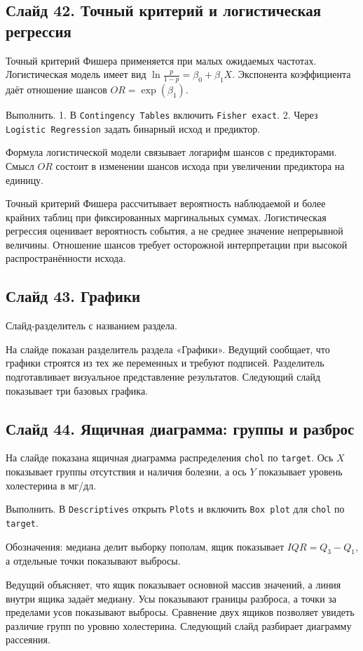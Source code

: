\documentclass[11pt,a4paper]{article}
\begin{document}
\subsection*{Слайд 42. Точный критерий и логистическая регрессия}
\begin{onslide}
Точный критерий Фишера применяется при малых ожидаемых частотах. Логистическая модель имеет вид $\ln\frac{p}{1-p}=\beta_0+\beta_1X$. Экспонента коэффициента даёт отношение шансов $OR=\exp(\beta_1)$.
\end{onslide}
\begin{jamovi}
Выполнить. 1. В \texttt{Contingency Tables} включить \texttt{Fisher exact}. 2. Через \texttt{Logistic Regression} задать бинарный исход и предиктор.\par Формула логистической модели связывает логарифм шансов с предикторами. Смысл $OR$ состоит в изменении шансов исхода при увеличении предиктора на единицу.
\end{jamovi}
Точный критерий Фишера рассчитывает вероятность наблюдаемой и более крайних таблиц при фиксированных маргинальных суммах. Логистическая регрессия оценивает вероятность события, а не среднее значение непрерывной величины. Отношение шансов требует осторожной интерпретации при высокой распространённости исхода.

\subsection*{Слайд 43. Графики}
\begin{onslide}
Слайд-разделитель с названием раздела.
\end{onslide}
На слайде показан разделитель раздела «Графики». Ведущий сообщает, что графики строятся из тех же переменных и требуют подписей. Разделитель подготавливает визуальное представление результатов. Следующий слайд показывает три базовых графика.

\subsection*{Слайд 44. Ящичная диаграмма: группы и разброс}
\begin{onslide}
На слайде показана ящичная диаграмма распределения \texttt{chol} по \texttt{target}. Ось $X$ показывает группы отсутствия и наличия болезни, а ось $Y$ показывает уровень холестерина в мг/дл.
\end{onslide}
\begin{jamovi}
Выполнить. В \texttt{Descriptives} открыть \texttt{Plots} и включить \texttt{Box plot} для \texttt{chol} по \texttt{target}.\par Обозначения: медиана делит выборку пополам, ящик показывает $IQR=Q_3-Q_1$, а отдельные точки показывают выбросы.
\end{jamovi}
Ведущий объясняет, что ящик показывает основной массив значений, а линия внутри ящика задаёт медиану. Усы показывают границы разброса, а точки за пределами усов показывают выбросы. Сравнение двух ящиков позволяет увидеть различие групп по уровню холестерина. Следующий слайд разбирает диаграмму рассеяния.
\end{document}
